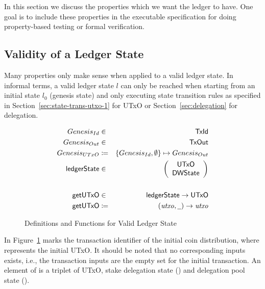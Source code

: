 In this section we discuss the properties which we want the ledger to have. One
goal is to include these properties in the executable specification for doing
property-based testing or formal verification.

\subsection{Validity of a Ledger State}
\label{sec:valid-ledg-state}

Many properties only make sense when applied to a valid ledger state. In
informal terms, a valid ledger state $l$ can only be reached when starting from
an initial state $l_{0}$ (genesis state) and only executing state transition
rules as specified in Section~\ref{sec:state-trans-utxo-1} for UTxO or
Section~\ref{sec:delegation} for delegation.

\begin{figure}[ht]
  \centering
  \begin{align*}
    \genesisId & \in & \TxId \\
    \genesisTxOut & \in & \TxOut \\
    \genesisUTxO & \coloneqq & \{\genesisId, \emptyset\} \mapsto \genesisTxOut
    \\
    \ledgerState & \in & \left(
                         \begin{array}{c}
                           \UTxO \\
                           \DWState
                         \end{array}
    \right)\\
               && \\
    \fun{getUTxO} & \in & \ledgerState \to \UTxO \\
    \fun{getUTxO} & \coloneqq & (\var{utxo}, \wcard) \to \var{utxo}
  \end{align*}
  \caption{Definitions and Functions for Valid Ledger State}
  \label{fig:valid-ledger}
\end{figure}

In Figure~\ref{fig:valid-ledger} \genesisId{} marks the transaction identifier
of the initial coin distribution, where \genesisTxOut{} represents the initial
UTxO. It should be noted that no corresponding inputs exists, i.e., the
transaction inputs are the empty set for the initial transaction. An element of
\ledgerState{} is a triplet of UTxO, stake delegation state (\DState) and
delegation pool state (\PState).

